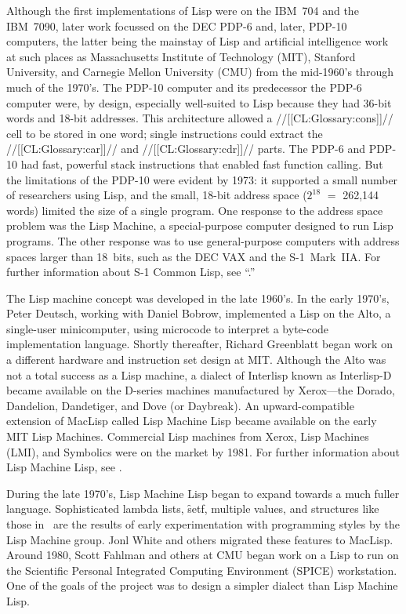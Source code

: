 Although the first implementations of Lisp were on the IBM~704 and the
IBM~7090, later work focussed on the DEC
PDP-6 and, later, PDP-10 computers, the latter being the mainstay of
Lisp and artificial intelligence work at such places as 
Massachusetts Institute of Technology (MIT), Stanford University,
and 
Carnegie Mellon University (CMU) from the mid-1960's through much of the 1970's.
The PDP-10 computer and its predecessor the PDP-6 computer were, by
design, especially well-suited to Lisp because they had 36-bit words
and 18-bit addresses. This architecture allowed a //[[CL:Glossary:cons]]// cell to be
stored in one word; single instructions could extract the 
//[[CL:Glossary:car]]// and //[[CL:Glossary:cdr]]//
parts.  The PDP-6 and PDP-10 had fast, powerful stack instructions
that enabled fast function calling.
But the limitations of the PDP-10 were evident by 1973: it supported a
small number of researchers using Lisp, and the small, 18-bit address
space ($2^{18}$ $=$ 262,144 words) limited the size of a single
program.
One response to the address space problem was the Lisp Machine, a
special-purpose computer designed to run Lisp programs.  The other
response was to use general-purpose computers with address spaces
larger than 18~bits, such as the DEC VAX and
the \hbox{S-1}~Mark~IIA.
For further information about S-1 Common Lisp, see ``{\SOneCLPaper}.''
 
The Lisp machine concept was developed in the late 1960's.  In the
early 1970's, Peter Deutsch, working with 
Daniel Bobrow, implemented a Lisp on the
Alto, a single-user minicomputer, using microcode to interpret a
byte-code implementation language. Shortly thereafter, Richard
Greenblatt began work on a different hardware and instruction set
design at MIT.
Although the Alto was not a total success as a Lisp machine, a dialect
of Interlisp known as Interlisp-D became available on the D-series
machines manufactured by Xerox---the Dorado, Dandelion,
Dandetiger, and Dove (or Daybreak).
An upward-compatible extension of MacLisp called Lisp
Machine Lisp became available on the early MIT Lisp Machines.
Commercial Lisp machines from Xerox, Lisp Machines (LMI), and
Symbolics were on the market by 1981.
For further information about Lisp Machine Lisp, see {\Chinual}.
 
During the late 1970's, Lisp Machine Lisp began to expand towards a
much fuller language.  Sophisticated lambda lists, 
\f{setf}, multiple values, and structures
like those in \clisp\ are the results of early
experimentation with programming styles by the Lisp Machine group.
Jonl White and others migrated these features to MacLisp.
Around 1980, Scott Fahlman and others at CMU began work on a Lisp to
run on the Scientific Personal Integrated Computing
Environment (SPICE) workstation.  One of the goals of the project was to
design a simpler dialect than Lisp Machine Lisp.
 
